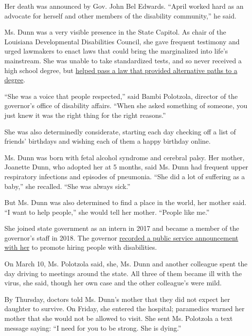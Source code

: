 Her death was announced by Gov. John Bel Edwards. ``April worked hard as
an advocate for herself and other members of the disability community,''
he said.

Ms. Dunn was a very visible presence in the State Capitol. As chair of
the Louisiana Developmental Disabilities Council, she gave frequent
testimony and urged lawmakers to enact laws that could bring the
marginalized into life's mainstream. She was unable to take standardized
tests, and so never received a high school degree, but
\href{https://laddc.org/initiatives/education-and-early-intervention/current-education-issues/promotiondiploma-pathways/}{helped
pass a law that provided alternative paths to a degree}.

``She was a voice that people respected,'' said Bambi Polotzola,
director of the governor's office of disability affairs. ``When she
asked something of someone, you just knew it was the right thing for the
right reasons.''

She was also determinedly considerate, starting each day checking off a
list of friends' birthdays and wishing each of them a happy birthday
online.

Ms. Dunn was born with fetal alcohol syndrome and cerebral palsy. Her
mother, Joanette Dunn, who adopted her at 5 months, said Ms. Dunn had
frequent upper respiratory infections and episodes of pneumonia. ``She
did a lot of suffering as a baby,'' she recalled. ``She was always
sick.''

But Ms. Dunn was also determined to find a place in the world, her
mother said. ``I want to help people,'' she would tell her mother.
``People like me.''

She joined state government as an intern in 2017 and became a member of
the governor's staff in 2018. The governor
\href{https://gov.louisiana.gov/assets/images/April/Untitled.mp4}{recorded
a public service announcement with her} to promote hiring people with
disabilities.

On March 10, Ms. Polotzola said, she, Ms. Dunn and another colleague
spent the day driving to meetings around the state. All three of them
became ill with the virus, she said, though her own case and the other
colleague's were mild.

By Thursday, doctors told Ms. Dunn's mother that they did not expect her
daughter to survive. On Friday, she entered the hospital; paramedics
warned her mother that she would not be allowed to visit. She sent Ms.
Polotzola a text message saying: ``I need for you to be strong. She is
dying.''

